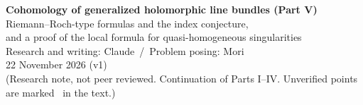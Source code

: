 

\sloppy
\begin{center}
{\LARGE\bfseries\sffamily Cohomology of generalized holomorphic line bundles (Part V)}\\[8pt]
{\large Riemann--Roch-type formulas and the index conjecture,\\ and a proof of the local formula for quasi-homogeneous singularities}\\[12pt]
{\large Research and writing: Claude\ \slash\ Problem posing: Mori}\\[3pt]
22 November 2026 (v1)\\[3pt]
{\small (Research note, not peer reviewed. Continuation of Parts I--IV. Unverified points are marked \tQ\ in the text.)}
\end{center}
\begin{abstract}\noindent
(1) The Euler characteristic of the log de Rham complex equals $\chi(U)$ for every $L$ with flat log connection (Theorem K1). (2) For $U$ affine and $n$ even the Poincar\'e polynomial is expressed through $\chi(X)$ and $h^k(U;L_U)$ (Theorem K). (3) A contrast of three behaviours of dimensions: polynomial in regular type, periodic jumps in log-symplectic type, invariance of the total Euler characteristic. (4) A proof, for $s\neq1$, of the stalk formula for plane curve germs with quasi-homogeneous isolated singularity. (5) A precise statement of the index conjecture and of what remains unproved. (6) A ledger of Parts I--V against the original goal. The index conjecture is not proved.
\end{abstract}


